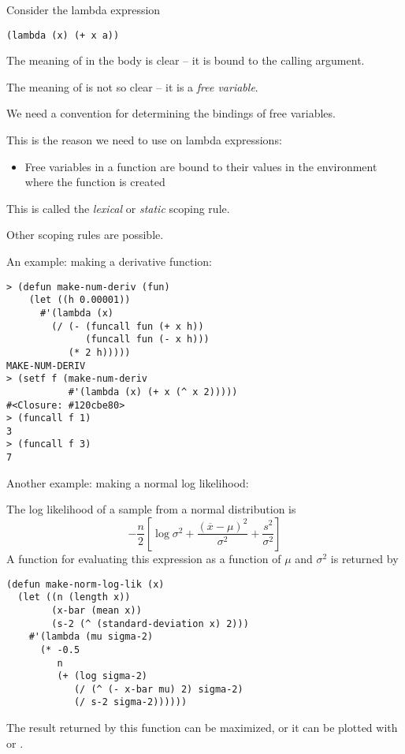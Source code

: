 \begin{slide}{}
Consider the lambda expression
{\Large
\begin{verbatim}
(lambda (x) (+ x a))
\end{verbatim}}
The meaning of  in the body is clear -- it is bound to the
calling argument.

The meaning of  is not so clear -- it is a {\em free variable}.
\end{slide}

\begin{slide}{}
We need a convention for determining the bindings of free variables.

This is the reason we need to use  on lambda expressions:

\begin{itemize}
\item[]
Free variables in a function are bound to their values in the
environment where the function is created
\end{itemize}
This is called the {\em lexical}\/ or {\em static}\/ scoping rule.

Other scoping rules are possible.
\end{slide}

\begin{slide}{}
An example: making a derivative function:
{\Large
\begin{verbatim}
> (defun make-num-deriv (fun)
    (let ((h 0.00001))
      #'(lambda (x)
        (/ (- (funcall fun (+ x h))
              (funcall fun (- x h)))
           (* 2 h)))))
MAKE-NUM-DERIV
> (setf f (make-num-deriv
           #'(lambda (x) (+ x (^ x 2)))))
#<Closure: #120cbe80>
> (funcall f 1)
3
> (funcall f 3)
7
\end{verbatim}}
\end{slide}

\begin{slide}{}
Another example: making a normal log likelihood:

The log likelihood of a sample from a normal distribution is
\begin{displaymath}
-\frac{n}{2}\left[\log \sigma^{2}
+ \frac{(\overline{x}-\mu)^{2}}{\sigma^{2}}
+ \frac{s^{2}}{\sigma^{2}}\right]
\end{displaymath}
A function for evaluating this expression as a function of $\mu$
and $\sigma^{2}$ is returned by
{\Large
\begin{verbatim}
(defun make-norm-log-lik (x)
  (let ((n (length x))
        (x-bar (mean x))
        (s-2 (^ (standard-deviation x) 2)))
    #'(lambda (mu sigma-2)
      (* -0.5
         n
         (+ (log sigma-2)
            (/ (^ (- x-bar mu) 2) sigma-2)
            (/ s-2 sigma-2))))))
\end{verbatim}}
The result returned by this function can be maximized, or it can be
plotted with  or .
\end{slide}

